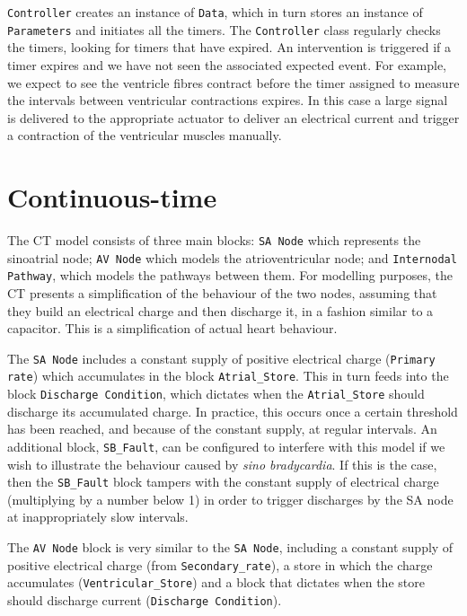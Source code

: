 \texttt{Controller} creates an instance of \texttt{Data}, which in
turn stores an instance of \texttt{Parameters} and initiates all the
timers.  The \texttt{Controller} class regularly checks the timers,
looking for timers that have expired.  An intervention is triggered if
a timer expires and we have not seen the associated expected event.
For example, we expect to see the ventricle fibres contract before the
timer assigned to measure the intervals between ventricular
contractions expires.  In this case a large signal is delivered to the
appropriate actuator to deliver an electrical current and trigger a
contraction of the ventricular muscles manually.

\section{Continuous-time}
The CT model consists of three main blocks: \texttt{SA Node} which
represents the sinoatrial node; \texttt{AV Node} which models the
atrioventricular node; and \texttt{Internodal Pathway}, which models
the pathways between them.  For modelling purposes, the CT presents a
simplification of the behaviour of the two nodes, assuming that they
build an electrical charge and then discharge it, in a fashion similar
to a capacitor.  This is a simplification of actual heart behaviour.

The \texttt{SA Node} includes a constant supply of positive electrical
charge (\texttt{Primary rate}) which accumulates in the block
\texttt{Atrial\_Store}.  This in turn feeds into the block
\texttt{Discharge Condition}, which dictates when the
\texttt{Atrial\_Store} should discharge its accumulated charge.  In
practice, this occurs once a certain threshold has been reached, and
because of the constant supply, at regular intervals.  An additional
block, \texttt{SB\_Fault}, can be configured to interfere with this
model if we wish to illustrate the behaviour caused by \emph{sino
  bradycardia}.  If this is the case, then the \texttt{SB\_Fault}
block tampers with the constant supply of electrical charge
(multiplying by a number below 1) in order to trigger discharges by
the SA node at inappropriately slow intervals.

The \texttt{AV Node} block is very similar to the \texttt{SA Node},
including a constant supply of positive electrical charge (from
\texttt{Secondary\_rate}), a store in which the charge accumulates
(\texttt{Ventricular\_Store}) and a block that dictates when the store
should discharge current (\texttt{Discharge Condition}).

